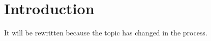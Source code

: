 
\section{Introduction}

    It will be rewritten because the topic has changed in the process.




